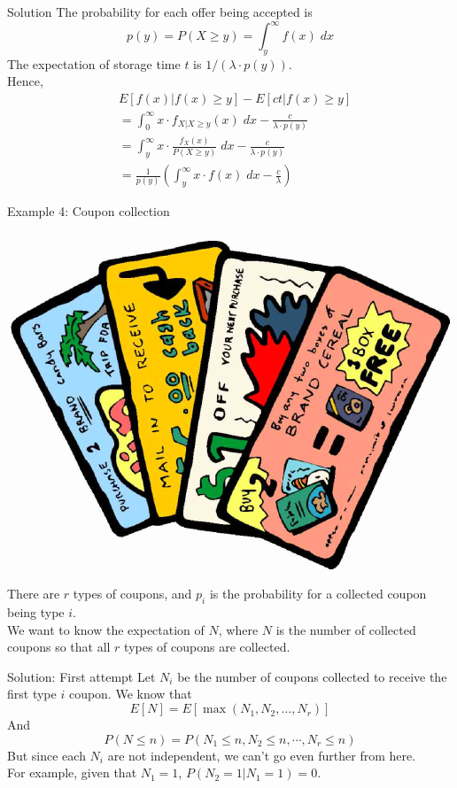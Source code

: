 \documentclass[mathserif]{beamer}
\begin{document}
\begin{frame}{Solution}
The probability for each offer being accepted is
\[
p(y) = P(X\geq y) = \int_y^\infty f(x)\; dx
\]
The expectation of storage time $t$ is $1/(\lambda\cdot p(y))$.\\
Hence,
\begin{align*}
& E[f(x) | f(x)\geq y] - E[ct | f(x)\geq y] \\
& = \int_0^\infty x\cdot f_{X|X\geq y}(x)\; dx - \frac{c}{\lambda\cdot p(y)} \\
& = \int_y^\infty x\cdot \frac{f_X(x)}{P(X\geq y)}\; dx - \frac{c}{\lambda\cdot p(y)} \\
& = \frac{1}{p(y)}\left( \int_y^\infty x\cdot f(x)\; dx - \frac{c}{\lambda} \right)
\end{align*}
\end{frame}

\begin{frame}{Example 4: Coupon collection}
\begin{center}
\includegraphics[scale=0.2]{coupon.png}
\end{center}
There are $r$ types of coupons, and $p_i$ is the probability for a collected coupon being type $i$.\\
\vspace{\baselineskip}
We want to know the expectation of $N$, where $N$ is the number of collected coupons so that all $r$ types of coupons are collected.
\end{frame}

\begin{frame}{Solution: First attempt}
Let $N_i$ be the number of coupons collected to receive the first type $i$ coupon.
We know that
\[
E[N] = E[\max(N_1, N_2, \ldots, N_r)]
\]
And
\[
P(N\leq n) = P(N_1\leq n, N_2\leq n, \cdots, N_r\leq n)
\]
But since each $N_i$ are not independent, we can't go even further from here.\\
For example, given that $N_1 = 1$, $P(N_2 = 1|N_1 = 1) = 0$.
\end{frame}
\end{document}
